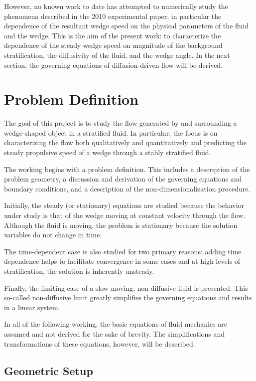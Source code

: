 \documentclass[12pt]{article}
\begin{document}
However, no known work to date has attempted to numerically study the phenomena described in the 2010 experimental paper, in particular the dependence of the resultant wedge speed on the physical parameters of the fluid and the wedge. This is the aim of the present work: to characterize the dependence of the steady wedge speed on magnitude of the background stratification, the diffusivity of the fluid, and the wedge angle. In the next section, the governing equations of diffusion-driven flow will be derived.

\newpage

\section{Problem Definition}

The goal of this project is to study the flow generated by and surrounding a wedge-shaped object in a stratified fluid. In particular, the focus is on characterizing the flow both qualitatively and quantitatively and predicting the steady propulsive speed of a wedge through a stably stratified fluid.

The working begins with a problem definition. This includes a description of the problem geometry, a discussion and derivation of the governing equations and boundary conditions, and a description of the non-dimensionalization procedure.

Initially, the steady (or stationary) equations are studied because the behavior under study is that of the wedge moving at constant velocity through the flow. Although the fluid is moving, the problem is stationary because the solution variables do not change in time.

The time-dependent case is also studied for two primary reasons: adding time dependence helps to facilitate convergence in some cases and at high levels of stratification, the solution is inherently unsteady.

Finally, the limiting case of a slow-moving, non-diffusive fluid is presented. This so-called non-diffusive limit greatly simplifies the governing equations and results in a linear system.

In all of the following working, the basic equations of fluid mechanics are assumed and not derived for the sake of brevity. The simplifications and transformations of these equations, however, will be described.

\subsection{Geometric Setup}
\end{document}
